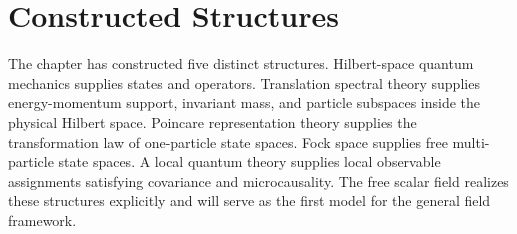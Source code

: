 \section{Constructed Structures}

The chapter has constructed five distinct structures. Hilbert-space quantum
mechanics supplies states and operators. Translation spectral theory supplies
energy-momentum support, invariant mass, and particle subspaces inside the
physical Hilbert space. Poincare representation theory supplies the
transformation law of one-particle state spaces. Fock space supplies free
multi-particle state spaces. A local quantum theory supplies local observable
assignments satisfying covariance and microcausality. The free scalar field
realizes these structures explicitly and will serve as the first model for
the general field framework.
